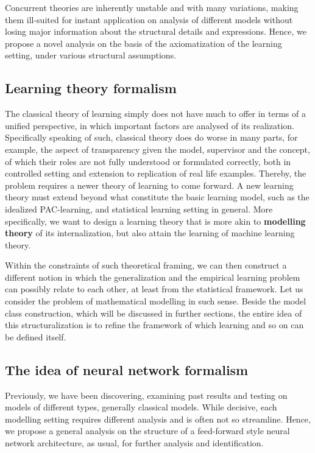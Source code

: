 \documentclass[10pt]{article} %
\begin{document}
Concurrent theories are inherently unstable and with many variations, making them ill-suited for instant application on analysis of different models without losing major information about the structural details and expressions. Hence, we propose a novel analysis on the basis of the axiomatization of the learning setting, under various structural assumptions. 

\subsection{Learning theory formalism}

The classical theory of learning simply does not have much to offer in terms of a unified perspective, in which important factors are analysed of its realization. Specifically speaking of such, classical theory does do worse in many parts, for example, the aspect of transparency given the model, supervisor and the concept, of which their roles are not fully understood or formulated correctly, both in controlled setting and extension to replication of real life examples. Thereby, the problem requires a newer theory of learning to come forward. A new learning theory must extend beyond what constitute the basic learning model, such as the idealized PAC-learning, and statistical learning setting in general. More specifically, we want to design a learning theory that is more akin to \textbf{modelling theory} of its internalization, but also attain the learning of machine learning theory. 

Within the constraints of such theoretical framing, we can then construct a different notion in which the generalization and the empirical learning problem can possibly relate to each other, at least from the statistical framework. Let us consider the problem of mathematical modelling in such sense. Beside the model class construction, which will be discussed in further sections, the entire idea of this structuralization is to refine the framework of which learning and so on can be defined itself. 

\subsection{The idea of neural network formalism}
Previously, we have been discovering, examining past results and testing on models of different types, generally classical models. While decisive, each modelling setting requires different analysis and is often not so streamline. Hence, we propose a general analysis on the structure of a feed-forward style neural network architecture, as usual, for further analysis and identification. 
\end{document}
